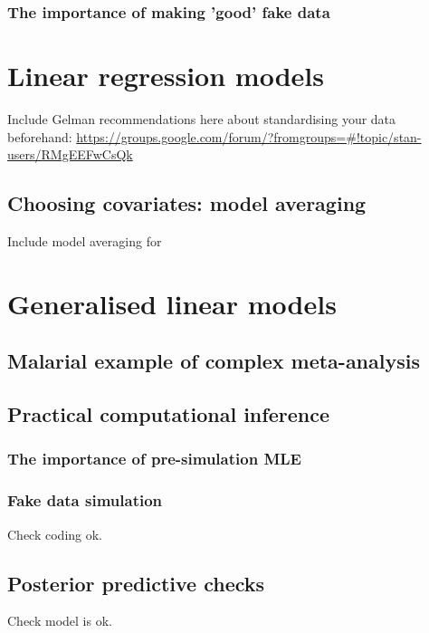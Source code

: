 \documentclass[11pt,fullpage]{book}
\begin{document}
\subsection{The importance of making 'good' fake data}

\chapter{Linear regression models}
Include Gelman recommendations here about standardising your data beforehand: \url{https://groups.google.com/forum/?fromgroups=#!topic/stan-users/RMgEEFwCsQk}

\section{Choosing covariates: model averaging}\label{sec:Regression_modelAveraging}
Include model averaging for 

\chapter{Generalised linear models}
\section{Malarial example of complex meta-analysis}
\section{Practical computational inference}
\subsection{The importance of pre-simulation MLE}
\subsection{Fake data simulation}
Check coding ok.

\section{Posterior predictive checks}
Check model is ok.






\printindex
\end{document}
